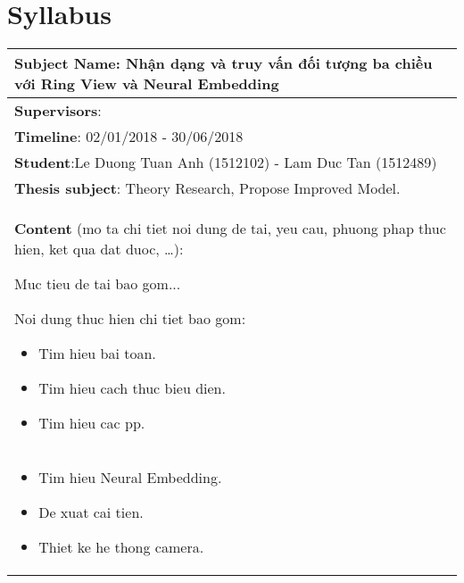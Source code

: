 \chapter{Syllabus}
\begin{longtable}{|l|c|}
\hline
\multicolumn{2}{|m{\linewidth}|}{\textbf{Subject Name}: Nhận dạng và truy vấn đối tượng ba chiều với Ring View và Neural Embedding
}\\
\hline
\multicolumn{2}{|m{\linewidth}|}{\textbf{Supervisors}: } \\
\hline
\multicolumn{2}{|m{\linewidth}|}{\textbf{Timeline}: 02/01/2018 - 30/06/2018}\\
\hline
\multicolumn{2}{|m{\linewidth}|}{\textbf{Student}:Le Duong Tuan Anh (1512102) - Lam Duc Tan (1512489)}\\
\hline
\multicolumn{2}{|m{\linewidth}|}{\textbf{Thesis subject}: Theory Research, Propose Improved Model.}\\
\hline
\multicolumn{2}{|m{\linewidth}|}{\textbf{Content} (mo ta chi tiet noi dung de tai, yeu cau, phuong phap thuc hien, ket qua dat duoc, …):\par
Muc tieu de tai bao gom...\par
Noi dung thuc hien chi tiet bao gom:
\begin{itemize}
\item Tim hieu bai toan.
\item Tim hieu cach thuc bieu dien.
\item Tim hieu cac pp.

\end{itemize}}\\
\hline
\multicolumn{2}{|m{\linewidth}|}{\begin{itemize}

\item Tim hieu Neural Embedding.

\item De xuat cai tien.

\item Thiet ke he thong camera.


\end{itemize}}
\end{longtable}
